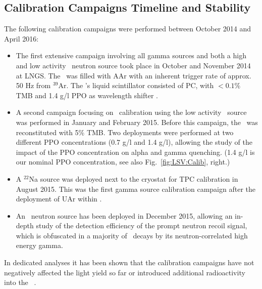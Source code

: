 \subsection{Calibration Campaigns Timeline and Stability}
The following calibration campaigns were performed between October 2014 and April 2016:
\begin{itemize}
\item The first extensive campaign involving all gamma sources and both a high and low activity \AmBe\ neutron source took place in October and November 2014 at LNGS. The \tpc\ was filled with AAr with an inherent trigger rate of approx. 50 Hz from $^{39}$Ar. The \lsv's liquid scintillator consisted of PC, with $<0.1 \%$ TMB and 1.4 g/l PPO as wavelength shifter \cite{Agnes:2015qyz}.

\item A second campaign focusing on \lsv\ calibration using the low activity \AmBe\ source was performed in January and February 2015. Before this campaign, the \lsv\ was reconstituted with 5\% TMB. Two deployments were performed at two different PPO concentrations (0.7 g/l and 1.4 g/l), allowing the study of the impact of the PPO concentration on alpha and gamma quenching. (1.4 g/l is our nominal PPO concentration, see also Fig.~\ref{fig:LSV:Calib}, right.)
\item A $^{22}$Na source was deployed next to the cryostat for TPC calibration in August 2015. This was the first gamma source calibration campaign after the deployment of UAr within \dsf.
\item An \AmC\ neutron source has been deployed in December 2015, allowing an in-depth study of the detection efficiency of the prompt neutron recoil signal, which is obfuscated in a majority of \AmBe\ decays by its neutron-correlated high energy gamma.
\end{itemize}

In dedicated analyses it has been shown that the calibration campaigns have not negatively affected the light yield so far or introduced additional radioactivity into the \lsv\ \cite{Agnes:2015qyz}.




